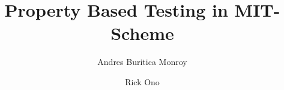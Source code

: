 \documentclass[runningheads]{llncs}
\begin{document}
%
\title{Property Based Testing in MIT-Scheme}
%
%
\author{Andres Buritica Monroy \and
Rick Ono}
%
%
\institute{}
%
\maketitle              %
%


%
%
%










%
%

%
%
%
% 
% 
%
\end{document}
